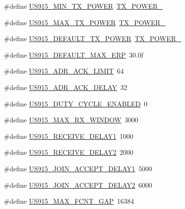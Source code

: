 \begin{DoxyCompactItemize}
\item 
\#define \hyperlink{group__REGIONUS915_ga7043556b6107cc2ca3f1275ee94dbb66}{U\+S915\+\_\+\+M\+I\+N\+\_\+\+T\+X\+\_\+\+P\+O\+W\+ER}~\hyperlink{group__REGION_gac9747c69350f34d485c3134e5a57655b}{T\+X\+\_\+\+P\+O\+W\+E\+R\+\_}
\item 
\#define \hyperlink{group__REGIONUS915_gaa43b92e4e5cf26691dda96f7c4969c25}{U\+S915\+\_\+\+M\+A\+X\+\_\+\+T\+X\+\_\+\+P\+O\+W\+ER}~\hyperlink{group__REGION_gab33618449f2a573142c463ab071ef8ed}{T\+X\+\_\+\+P\+O\+W\+E\+R\+\_}
\item 
\#define \hyperlink{group__REGIONUS915_ga45523843f3ddf11f06daa7f0b306659c}{U\+S915\+\_\+\+D\+E\+F\+A\+U\+L\+T\+\_\+\+T\+X\+\_\+\+P\+O\+W\+ER}~\hyperlink{group__REGION_gab33618449f2a573142c463ab071ef8ed}{T\+X\+\_\+\+P\+O\+W\+E\+R\+\_}
\item 
\#define \hyperlink{group__REGIONUS915_gaf7ef0a7e48f12d53dc02e371cd136934}{U\+S915\+\_\+\+D\+E\+F\+A\+U\+L\+T\+\_\+\+M\+A\+X\+\_\+\+E\+RP}~30.\+0f
\item 
\#define \hyperlink{group__REGIONUS915_ga46682acd6e4eb5f39516361bdec8e4e7}{U\+S915\+\_\+\+A\+D\+R\+\_\+\+A\+C\+K\+\_\+\+L\+I\+M\+IT}~64
\item 
\#define \hyperlink{group__REGIONUS915_gac7ffa998cf39a8f85c022b4467dfac53}{U\+S915\+\_\+\+A\+D\+R\+\_\+\+A\+C\+K\+\_\+\+D\+E\+L\+AY}~32
\item 
\#define \hyperlink{group__REGIONUS915_ga18f2e3af9cd1115d71597a3250f0e8ee}{U\+S915\+\_\+\+D\+U\+T\+Y\+\_\+\+C\+Y\+C\+L\+E\+\_\+\+E\+N\+A\+B\+L\+ED}~0
\item 
\#define \hyperlink{group__REGIONUS915_gaa2234c0c26fa010e6219ee81c51cf36f}{U\+S915\+\_\+\+M\+A\+X\+\_\+\+R\+X\+\_\+\+W\+I\+N\+D\+OW}~3000
\item 
\#define \hyperlink{group__REGIONUS915_gab1669f54e93ff0e995a5ebf186ed2fb7}{U\+S915\+\_\+\+R\+E\+C\+E\+I\+V\+E\+\_\+\+D\+E\+L\+A\+Y1}~1000
\item 
\#define \hyperlink{group__REGIONUS915_ga5844c7df39049cc6fe3926967de6670f}{U\+S915\+\_\+\+R\+E\+C\+E\+I\+V\+E\+\_\+\+D\+E\+L\+A\+Y2}~2000
\item 
\#define \hyperlink{group__REGIONUS915_gad282ec44fff6d4b6136a7663529e7b75}{U\+S915\+\_\+\+J\+O\+I\+N\+\_\+\+A\+C\+C\+E\+P\+T\+\_\+\+D\+E\+L\+A\+Y1}~5000
\item 
\#define \hyperlink{group__REGIONUS915_ga3dc88cfa8f3ab79283a15fcb8cdcc722}{U\+S915\+\_\+\+J\+O\+I\+N\+\_\+\+A\+C\+C\+E\+P\+T\+\_\+\+D\+E\+L\+A\+Y2}~6000
\item 
\#define \hyperlink{group__REGIONUS915_gaeade915fc815e603546a8bc14015cd16}{U\+S915\+\_\+\+M\+A\+X\+\_\+\+F\+C\+N\+T\+\_\+\+G\+AP}~16384

\end{DoxyCompactItemize}
